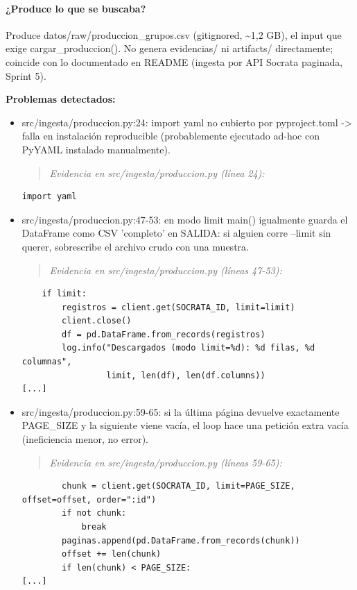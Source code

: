 \paragraph{¿Produce lo que se buscaba?}
Produce datos/raw/produccion\_grupos.csv (gitignored, \textasciitilde{}1,2 GB), el input que exige cargar\_produccion(). No genera evidencias/ ni artifacts/ directamente; coincide con lo documentado en README (ingesta por API Socrata paginada, Sprint 5).

\begin{tcolorbox}[riesgo]
\textbf{Problemas detectados:}
\begin{itemize}
  \item src/ingesta/produccion.py:24: import yaml no cubierto por pyproject.toml -> falla en instalación reproducible (probablemente ejecutado ad-hoc con PyYAML instalado manualmente).
\begin{quote}\footnotesize\ttfamily
\noindent\emph{Evidencia en src/ingesta/produccion.py (línea 24):}
\end{quote}
\begin{lstlisting}
import yaml
\end{lstlisting}

  \item src/ingesta/produccion.py:47-53: en modo limit main() igualmente guarda el DataFrame como CSV 'completo' en SALIDA: si alguien corre --limit sin querer, sobrescribe el archivo crudo con una muestra.
\begin{quote}\footnotesize\ttfamily
\noindent\emph{Evidencia en src/ingesta/produccion.py (líneas 47-53):}
\end{quote}
\begin{lstlisting}
    if limit:
        registros = client.get(SOCRATA_ID, limit=limit)
        client.close()
        df = pd.DataFrame.from_records(registros)
        log.info("Descargados (modo limit=%d): %d filas, %d columnas",
                 limit, len(df), len(df.columns))
[...]
\end{lstlisting}

  \item src/ingesta/produccion.py:59-65: si la última página devuelve exactamente PAGE\_SIZE y la siguiente viene vacía, el loop hace una petición extra vacía (ineficiencia menor, no error).
\begin{quote}\footnotesize\ttfamily
\noindent\emph{Evidencia en src/ingesta/produccion.py (líneas 59-65):}
\end{quote}
\begin{lstlisting}
        chunk = client.get(SOCRATA_ID, limit=PAGE_SIZE, offset=offset, order=":id")
        if not chunk:
            break
        paginas.append(pd.DataFrame.from_records(chunk))
        offset += len(chunk)
        if len(chunk) < PAGE_SIZE:
[...]
\end{lstlisting}

\end{itemize}
\end{tcolorbox}

